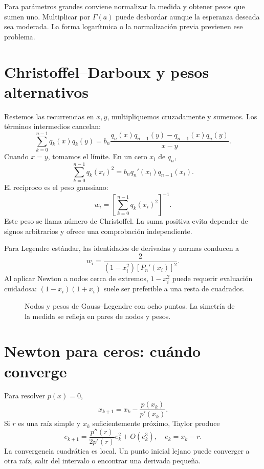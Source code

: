 \documentclass[11pt,a4paper]{article}
\theoremstyle{definition}
\newcounter{problema}
\begin{document}
Para parámetros grandes conviene normalizar la medida y obtener pesos que sumen uno. Multiplicar por $\Gamma(a)$ puede desbordar aunque la esperanza deseada sea moderada. La forma logarítmica o la normalización previa previenen ese problema.

\section{Christoffel--Darboux y pesos alternativos}
Restemos las recurrencias en $x,y$, multipliquemos cruzadamente y sumemos. Los términos intermedios cancelan:
\[
\sum_{k=0}^{n-1}q_k(x)q_k(y)
=b_n\frac{q_n(x)q_{n-1}(y)-q_{n-1}(x)q_n(y)}{x-y}.
\]
Cuando $x=y$, tomamos el límite. En un cero $x_i$ de $q_n$,
\[
\sum_{k=0}^{n-1}q_k(x_i)^2
=b_nq_n'(x_i)q_{n-1}(x_i).
\]
El recíproco es el peso gaussiano:
\[
w_i=\left[\sum_{k=0}^{n-1}q_k(x_i)^2\right]^{-1}.
\]
Este peso se llama número de Christoffel. La suma positiva evita depender de signos arbitrarios y ofrece una comprobación independiente.

Para Legendre estándar, las identidades de derivadas y normas conducen a
\[
w_i=\frac2{(1-x_i^2)[P_n'(x_i)]^2}.
\]
Al aplicar Newton a nodos cerca de extremos, $1-x_i^2$ puede requerir evaluación cuidadosa: $(1-x_i)(1+x_i)$ suele ser preferible a una resta de cuadrados.






\begin{figure}[htbp]\centering
{}
\caption{Nodos y pesos de Gauss--Legendre con ocho puntos. La simetría de la medida se refleja en pares de nodos y pesos.}\label{fig:cdf-9}\end{figure}

\section{Newton para ceros: cuándo converge}
Para resolver $p(x)=0$,
\[
x_{k+1}=x_k-\frac{p(x_k)}{p'(x_k)}.
\]
Si $r$ es una raíz simple y $x_k$ suficientemente próximo, Taylor produce
\[
e_{k+1}=\frac{p''(r)}{2p'(r)}e_k^2+O(e_k^3),
\quad e_k=x_k-r.
\]
La convergencia cuadrática es local. Un punto inicial lejano puede converger a otra raíz, salir del intervalo o encontrar una derivada pequeña.
\end{document}
